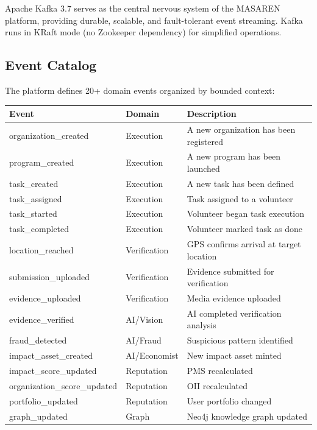 \documentclass[11pt,a4paper]{article}
\begin{document}
Apache Kafka 3.7 serves as the central nervous system of the MASAREN platform, providing durable, scalable, and fault-tolerant event streaming. Kafka runs in KRaft mode (no Zookeeper dependency) for simplified operations.

\subsection{Event Catalog}

The platform defines 20+ domain events organized by bounded context:

\begin{tabular}{|p{4cm}|p{3cm}|p{6cm}|}
\hline
\textbf{Event} & \textbf{Domain} & \textbf{Description} \\
\hline
organization\_created & Execution & A new organization has been registered \\
\hline
program\_created & Execution & A new program has been launched \\
\hline
task\_created & Execution & A new task has been defined \\
\hline
task\_assigned & Execution & Task assigned to a volunteer \\
\hline
task\_started & Execution & Volunteer began task execution \\
\hline
task\_completed & Execution & Volunteer marked task as done \\
\hline
location\_reached & Verification & GPS confirms arrival at target location \\
\hline
submission\_uploaded & Verification & Evidence submitted for verification \\
\hline
evidence\_uploaded & Verification & Media evidence uploaded \\
\hline
evidence\_verified & AI/Vision & AI completed verification analysis \\
\hline
fraud\_detected & AI/Fraud & Suspicious pattern identified \\
\hline
impact\_asset\_created & AI/Economist & New impact asset minted \\
\hline
impact\_score\_updated & Reputation & PMS recalculated \\
\hline
organization\_score\_updated & Reputation & OII recalculated \\
\hline
portfolio\_updated & Reputation & User portfolio changed \\
\hline
graph\_updated & Graph & Neo4j knowledge graph updated \\
\hline
\end{tabular}
\end{document}
